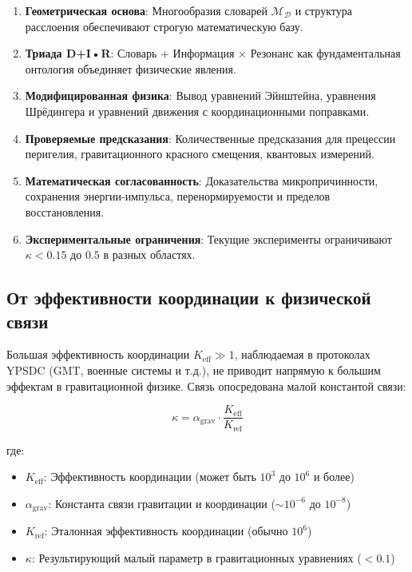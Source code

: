 \documentclass[11pt,a4paper]{article}
\begin{document}
	\begin{enumerate}
		\item \textbf{Геометрическая основа}: Многообразия словарей $\mathcal{M}_{\mathcal{D}}$ и структура расслоения обеспечивают строгую математическую базу.
		
		\item \textbf{Триада D+I•R}: Словарь + Информация × Резонанс как фундаментальная онтология объединяет физические явления.
		
		\item \textbf{Модифицированная физика}: Вывод уравнений Эйнштейна, уравнения Шрёдингера и уравнений движения с координационными поправками.
		
		\item \textbf{Проверяемые предсказания}: Количественные предсказания для прецессии перигелия, гравитационного красного смещения, квантовых измерений.
		
		\item \textbf{Математическая согласованность}: Доказательства микропричинности, сохранения энергии-импульса, перенормируемости и пределов восстановления.
		
		\item \textbf{Экспериментальные ограничения}: Текущие эксперименты ограничивают $\kappa < 0.15$ до $0.5$ в разных областях.
	\end{enumerate}
	
	
	\subsection{От эффективности координации к физической связи}
	\label{subsec:keff-to-coupling}
	
	Большая эффективность координации $K_{\mathrm{eff}} \gg 1$, наблюдаемая в протоколах YPSDC (GMT, военные системы и т.д.), не приводит напрямую к большим эффектам в гравитационной физике. Связь опосредована малой константой связи:
	
	\begin{equation}
		\kappa = \alpha_{\text{grav}} \cdot \frac{K_{\mathrm{eff}}}{K_{\text{ref}}}
	\end{equation}
	
	где:
	\begin{itemize}
		\item $K_{\mathrm{eff}}$: Эффективность координации (может быть $10^3$ до $10^6$ и более)
		\item $\alpha_{\text{grav}}$: Константа связи гравитации и координации ($\sim 10^{-6}$ до $10^{-8}$)
		\item $K_{\text{ref}}$: Эталонная эффективность координации (обычно $10^6$)
		\item $\kappa$: Результирующий малый параметр в гравитационных уравнениях ($< 0.1$)
	\end{itemize}
	
\end{document}
